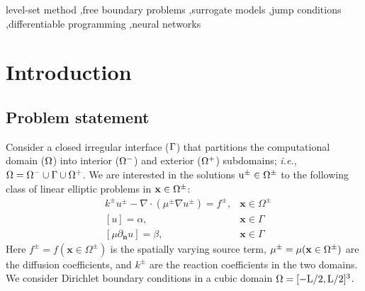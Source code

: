\documentclass{elsarticle}
\begin{document}
\begin{keyword}
	level-set method \sep free boundary problems \sep surrogate models \sep jump conditions \sep differentiable programming \sep neural networks
\end{keyword}

\maketitle
\def\thefootnote{$\dagger$}







\section{Introduction}
\label{sec::introduction}

\subsection{Problem statement}
Consider a closed irregular interface ($\rm \Gamma$) that partitions the computational domain ($\rm \Omega$) into interior ($\rm \Omega^-$) and exterior ($\rm \Omega^+$) subdomains; \textit{i.e.}, $\rm \Omega=\Omega^- \cup \Gamma \cup \Omega^+$. We are interested in the solutions $\rm u^\pm\in \Omega^\pm$ to the following class of linear elliptic problems in  $\rm \mathbf{x}\in\Omega^\pm$:
\begin{align*}
	 & k^{\pm}u^{\pm} - \nabla \cdot (\mu^{\pm}\nabla u^\pm)=f^{\pm}, & \mathbf{x}\in\Omega^\pm \\
	 & [u]=\alpha,                                                    & \mathbf{x} \in \Gamma   \\
	 & [\mu \partial_{\mathbf{n}}u]=\beta,                            & \mathbf{x} \in \Gamma
\end{align*}
Here $f^\pm=f(\mathbf{x} \in \Omega^\pm)$ is the spatially varying source term, $\rm \mu^\pm=\mu(\mathbf{x} \in \Omega^\pm)$  are the diffusion coefficients, and $k^\pm$ are the reaction coefficients in the two domains. We consider Dirichlet boundary conditions in a cubic domain $\rm \Omega=[-L/2,L/2]^3$.
\end{document}
